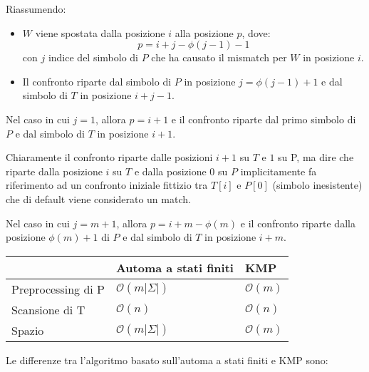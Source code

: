 Riassumendo:
\begin{itemize}
    \item $W$ viene spostata dalla posizione $i$ alla posizione $p$, dove:
          \begin{equation}
              p = i + j - \phi(j - 1) - 1
          \end{equation}
          con $j$ indice del simbolo di $P$ che ha causato il mismatch per $W$
          in posizione $i$.
    \item Il confronto riparte dal simbolo di $P$ in posizione $j = \phi(j - 1)
              + 1$ e dal simbolo di $T$ in posizione $i + j - 1$.
\end{itemize}
Nel caso in cui $j = 1$, allora $p = i + 1$ e il confronto riparte dal primo
simbolo di $P$ e dal simbolo di $T$ in posizione $i + 1$.
\begin{nota}
    Chiaramente il confronto riparte dalle posizioni $i + 1$ su $T$ e $1$ su P,
    ma dire che riparte dalla posizione $i$ su $T$ e dalla posizione $0$ su $P$
    implicitamente fa riferimento ad un confronto iniziale fittizio tra $T[i]$ e
    $P[0]$ (simbolo inesistente) che di default viene considerato un match.
\end{nota}
Nel caso in cui $j = m + 1$, allora $p = i + m - \phi(m)$ e il confronto
riparte dalla posizione $\phi(m) + 1$ di $P$ e dal simbolo di $T$ in posizione
$i + m$.
\begin{table}[!ht]
    \centering
    \begin{tabular}{|l|l|l|}
        \hline
                           & Automa a stati finiti     & KMP              \\ \hline
        Preprocessing di P & $\mathcal{O}(m |\Sigma|)$ & $\mathcal{O}(m)$ \\ \hline
        Scansione di T     & $\mathcal{O}(n)$          & $\mathcal{O}(n)$ \\ \hline
        Spazio             & $\mathcal{O}(m |\Sigma|)$ & $\mathcal{O}(m)$ \\ \hline
    \end{tabular}
\end{table}
Le differenze tra l'algoritmo basato sull'automa a stati finiti e KMP sono:
